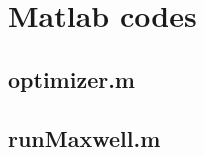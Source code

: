 \documentclass[11pt]{article}
\newcommand{\bahDir}{/Users/henshaw/DropBox/EM_Homogenization/notes}
\begin{document}


\appendix
\section{Matlab codes}

\subsection{optimizer.m}


\subsection{runMaxwell.m}


\clearpage


\end{document}
